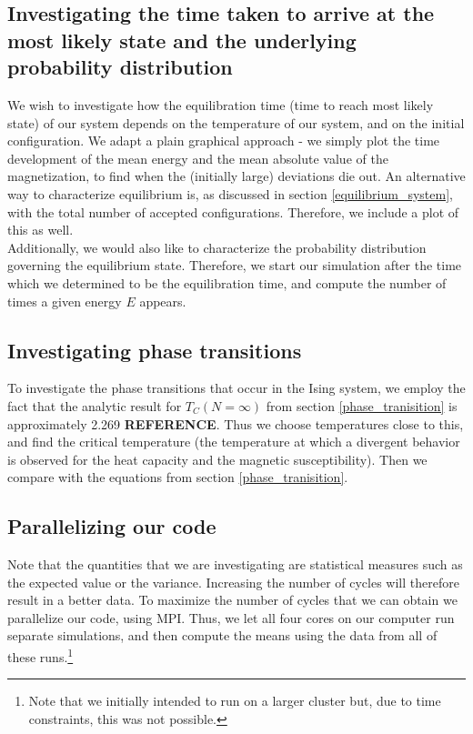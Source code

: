 \documentclass[a4paper, 10pt]{article}
\begin{document}
\subsection{Investigating the time taken to arrive at the most likely state and the underlying probability distribution}
We wish to investigate how the equilibration time (time to reach most likely state) of our system depends on the temperature of our system, and on the initial configuration. We adapt a plain graphical approach - we simply plot the time development of the mean energy and the mean absolute value of the magnetization, to find when the (initially large) deviations die out. An alternative way to characterize equilibrium is, as discussed in section \ref{equilibrium_system}, with the total number of accepted configurations. Therefore, we include a plot of this as well.\\
\linebreak
Additionally, we would also like to characterize the probability distribution governing the equilibrium state. Therefore, we start our simulation after the time which we determined to be the equilibration time, and compute the number of times a given energy $E$ appears.
\subsection{Investigating phase transitions}
To investigate the phase transitions that occur in the Ising system, we employ the fact that the analytic result for $T_C(N=\infty)$ from section \ref{phase_tranisition} is approximately 2.269 \textbf{REFERENCE}. Thus we choose temperatures close to this, and find the critical temperature (the temperature at which a divergent behavior is observed for the heat capacity and the magnetic susceptibility). Then we compare with the equations from section \ref{phase_tranisition}.
\subsection{Parallelizing our code}
Note that the quantities that we are investigating are statistical measures such as the expected value or the variance. Increasing the number of cycles will therefore result in a better data. To maximize the number of cycles that we can obtain we parallelize our code, using MPI. Thus, we let all four cores on our computer run separate simulations, and then compute the means using the data from all of these runs.\footnote{Note that we initially intended to run on a larger cluster but, due to time constraints, this was not possible.}
\end{document}
